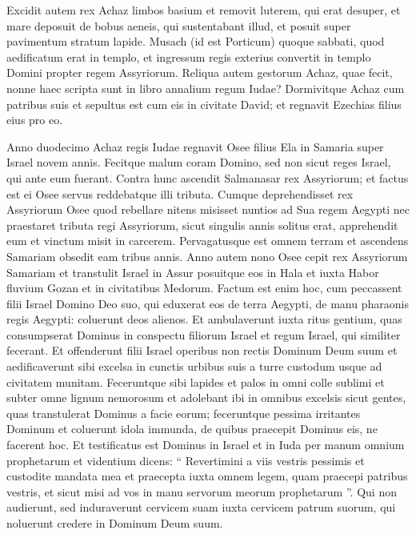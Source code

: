 \begin{biblechapter}
\begin{biblechapter}
\begin{biblechapter}
\begin{biblechapter}
\begin{biblechapter}
\begin{biblechapter}
\begin{biblechapter}
\begin{biblechapter}
\begin{biblechapter}
\begin{biblechapter}
\begin{biblechapter}
\begin{biblechapter}
\begin{biblechapter}
\begin{biblechapter}
\begin{biblechapter}
\begin{biblechapter}
\verse Excidit autem rex Achaz limbos basium et removit luterem, qui erat desuper, et mare deposuit de bobus aeneis, qui sustentabant illud, et posuit super pavimentum stratum lapide. 
\verse Musach (id est Porticum) quoque sabbati, quod aedificatum erat in templo, et ingressum regis exterius convertit in templo Domini propter regem Assyriorum.
 \verse Reliqua autem gestorum Achaz, quae fecit, nonne haec scripta sunt in libro annalium regum Iudae? 
\verse Dormivitque Achaz cum patribus suis et sepultus est cum eis in civitate David; et regnavit Ezechias filius eius pro eo.
 
\begin{biblechapter}
 \verse Anno duodecimo Achaz regis Iudae regnavit Osee filius Ela in Samaria super Israel novem annis. 
\verse Fecitque malum coram Domino, sed non sicut reges Israel, qui ante eum fuerant.
 \verse Contra hunc ascendit Salmanasar rex Assyriorum; et factus est ei Osee servus reddebatque illi tributa. 
\verse Cumque deprehendisset rex Assyriorum Osee quod rebellare nitens misisset nuntios ad Sua regem Aegypti nec praestaret tributa regi Assyriorum, sicut singulis annis solitus erat, apprehendit eum et vinctum misit in carcerem.
 \verse Pervagatusque est omnem terram et ascendens Samariam obsedit eam tribus annis. 
\verse Anno autem nono Osee cepit rex Assyriorum Samariam et transtulit Israel in Assur posuitque eos in Hala et iuxta Habor fluvium Gozan et in civitatibus Medorum.
 \verse Factum est enim hoc, cum peccassent filii Israel Domino Deo suo, qui eduxerat eos de terra Aegypti, de manu pharaonis regis Aegypti: coluerunt deos alienos. 
 \verse Et ambulaverunt iuxta ritus gentium, quas consumpserat Dominus in conspectu filiorum Israel et regum Israel, qui similiter fecerant. 
\verse Et offenderunt filii Israel operibus non rectis Dominum Deum suum et aedificaverunt sibi excelsa in cunctis urbibus suis a turre custodum usque ad civitatem munitam. 
 \verse Feceruntque sibi lapides et palos in omni colle sublimi et subter omne lignum nemorosum 
\verse et adolebant ibi in omnibus excelsis sicut gentes, quas transtulerat Dominus a facie eorum; feceruntque pessima irritantes Dominum 
 \verse et coluerunt idola immunda, de quibus praecepit Dominus eis, ne facerent hoc.
 \verse Et testificatus est Dominus in Israel et in Iuda per manum omnium prophetarum et videntium dicens: “ Revertimini a viis vestris pessimis et custodite mandata mea et praecepta iuxta omnem legem, quam praecepi patribus vestris, et sicut misi ad vos in manu servorum meorum prophetarum ”. 
\verse Qui non audierunt, sed induraverunt cervicem suam iuxta cervicem patrum suorum, qui noluerunt credere in Dominum Deum suum. 

\end{biblechapter}
\end{biblechapter}
\end{biblechapter}
\end{biblechapter}
\end{biblechapter}
\end{biblechapter}
\end{biblechapter}
\end{biblechapter}
\end{biblechapter}
\end{biblechapter}
\end{biblechapter}
\end{biblechapter}
\end{biblechapter}
\end{biblechapter}
\end{biblechapter}
\end{biblechapter}
\end{biblechapter}
